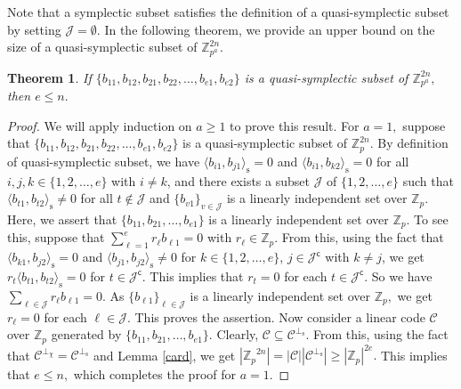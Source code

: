 \documentclass{article}
\newtheorem{thm}{Theorem}[section]
\theoremstyle{remark}
\theoremstyle{definition}
\numberwithin{equation}{section}
\begin{document}
Note that a symplectic subset satisfies the definition of a quasi-symplectic subset by setting $\mathcal{J} = \emptyset$. In the following theorem, we provide an upper bound on the size of a quasi-symplectic subset of ${\mathbb{Z}^{2n}_{p^a}}.$
\begin{thm} \label{tquasi} If $\{b_{11},b_{12},b_{21},b_{22},\ldots,b_{e1},b_{e2}\}$ is a quasi-symplectic subset of ${\mathbb{Z}^{2n}_{p^a}},$ then $e \leq n.$ 
\end{thm}
\begin{proof} We will apply induction on $a \geq 1$ to prove this result. For $a=1,$ suppose that $\{b_{11},b_{12},b_{21},b_{22},\ldots,b_{e1},b_{e2}\}$ is a quasi-symplectic subset of ${\mathbb{Z}^{2n}_{p}}$. By definition of quasi-symplectic subset, we have $\langle b_{i1}, b_{j1} \rangle_{\mathrm{s}}=0$ and $\langle b_{i1}, b_{k 2} \rangle_{\mathrm{s}}=0$ for all $i ,j, k  \in \{1,2,\ldots,e\}$ with $i \neq k$, and there exists a subset $\mathcal{J}$ of $\{1,2,\ldots,e \}$ such that $\langle b_{t1}, b_{t2} \rangle_{\mathrm{s}}\neq0$ for all $ t \not\in \mathcal{J}$ and $\{b_{v1} \}_{v \in \mathcal{J}}$ is a linearly independent set over $\mathbb{Z}_p$. Here, we assert that $\{b_{11},b_{21},\ldots,b_{e1}\}$ is a linearly independent set over $\mathbb{Z}_p.$ To see this, suppose that $\sum\limits_{\ell=1}^{e}r_\ell b_{\ell 1} =0$ with $r_\ell \in \mathbb{Z}_p.$ From this, using the fact that $\langle b_{k1}, b_{j2}\rangle_{\mathrm{s}} =0$ and $\langle b_{j1}, b_{j2}\rangle_{\mathrm{s}} \neq 0$ for $k \in \{1,2,\ldots,e\}$, $j \in \mathcal{J}^\mathsf{c}$ with $k \neq j$, we get $r_t\langle b_{t1}, b_{t2}\rangle_{\mathrm{s}} =0$ for $t \in \mathcal{J}^\mathsf{c}.$ This implies that $r_t=0$ for each $t \in \mathcal{J}^\mathsf{c}.$ So we have $\sum\limits_{ \ell \in \mathcal{J}}^{}  r_\ell b_{\ell 1} =0.$ As $\{b_{\ell 1}\}_{\ell \in \mathcal{J}}$ is a linearly independent set over $\mathbb{Z}_p,$ we get $r_\ell =0$ for each $\ell \in \mathcal{J}.$ This proves the assertion. Now consider a linear code $\mathcal{C}$ over $\mathbb{Z}_p$ generated by  $\{b_{11},b_{21},\ldots,b_{e1}\}.$ Clearly, $\mathcal{C} \subseteq \mathcal{C}^{\perp_{\mathrm{s}}}.$ From this, using the fact that $\mathcal{C}^{\perp_\chi}=\mathcal{C}^{\perp_{\mathrm{s}}}$ and Lemma \ref{card}, we get $|{\mathbb{Z}_p}^{2n}|=|\mathcal{C}||\mathcal{C}^{\perp_{\mathrm{s}}}|\geq |{\mathbb{Z}_p}|^{2e}.$ This implies that $e \leq n,$ which completes the proof for $a=1.$ 
 

\end{proof}
\end{document}

